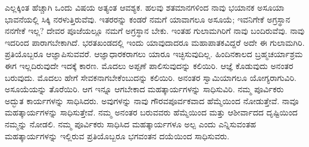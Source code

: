 ಎಲ್ಲಕ್ಕಿಂತ ಹೆಚ್ಚಾಗಿ ಒಂದು ವಿಷಯ ಅತ್ಯಂತ ಆವಶ್ಯಕ. ಹಲವು ಶತಮಾನಗಳಿಂದ ನಾವು ಭಯಾನಕ ಅಸೂಯಾ ಭಾವನೆಯಲ್ಲಿ ಸಿಕ್ಕಿ ನರಳುತ್ತಿರುವೆವು. ಇತರರನ್ನು ಕಂಡರೆ ನಮಗೆ ಯಾವಾಗಲೂ ಅಸೂಯೆ; ಇವನಿಗೇಕೆ ಅಗ್ರಸ್ಥಾನ ನನಗೇಕೆ ಇಲ್ಲ? ದೇವರ ಪೂಜೆಯಲ್ಲೂ ನಮಗೆ ಅಗ್ರಸ್ಥಾನ ಬೇಕು. ಇಂತಹ ಗುಲಾಮಗಿರಿಗೆ ನಾವು ಬಂದಿರುವೆವು. ನಾವು ಇದರಿಂದ ಪಾರಾಗಬೇಕಾಗಿದೆ. ಭರತಖಂಡದಲ್ಲಿ ಇಂದು ಯಾವುದಾದರೂ ಮಹಾಪಾತಕವಿದ್ದರೆ ಅದೇ ಈ ಗುಲಾಮಗಿರಿ. ಪ್ರತಿಯೊಬ್ಬರೂ ಆಜ್ಞಾಪಿಸುವವರೆ. ಆಜ್ಞಾಧಾರಕರಾಗಲು ಯಾರೂ ಇಚ್ಛಿಸುವುದಿಲ್ಲ. ಹಿಂದಿನಕಾಲದ ಬ್ರಹ್ಮಚರ್ಯಾಶ್ರಮ ಈಗ ಇಲ್ಲದಿರುವುದೇ ಇದಕ್ಕೆ ಕಾರಣ. ಮೊದಲು ಅಪ್ಪಣೆ ಪಾಲಿಸುವುದನ್ನು ಕಲಿಯಿರಿ. ಆಜ್ಞೆ ಕೊಡುವುದು ಅನಂತರ ಬರುವುದು. ಮೊದಲು ಹೇಗೆ ಸೇವಕನಾಗಬೇಕೆಂಬುದನ್ನು ಕಲಿಯಿರಿ. ಅನಂತರ ಸ್ವಾಮಿಯಾಗಲೂ ಯೋಗ್ಯರಾಗುವಿರಿ. ಅಸೂಯೆಯನ್ನು ತೊರೆಯಿರಿ. ಆಗ ಇನ್ನೂ ಆಗಬೇಕಾದ ಮಹತ್ಕಾರ್ಯಗಳನ್ನು ಸಾಧಿಸುವಿರಿ. ನಮ್ಮ ಪೂರ್ವಿಕರು ಅದ್ಭುತ ಕಾರ್ಯಗಳನ್ನು ಸಾಧಿಸಿದರು. ಅವುಗಳನ್ನು ನಾವು ಗೌರವಪೂರ್ವಕವಾದ ಹೆಮ್ಮೆಯಿಂದ ನೋಡುತ್ತೇವೆ. ನಾವೂ ಮಹತ್ಕಾರ್ಯಗಳನ್ನು ಸಾಧಿಸುತ್ತೇವೆ. ನಮ್ಮ ಅನಂತರ ಬರುವವರು ಹೆಮ್ಮೆಯಿಂದ ಮತ್ತು ಆಶೀರ್ವಾದದ ದೃಷ್ಟಿಯಿಂದ ನಮ್ಮನ್ನು ನೋಡಲಿ. ನಮ್ಮ ಪೂರ್ವಿಕರು ಸಾಧಿಸಿದ ಮಹತ್ಕಾರ್ಯಗಳೂ ಅಲ್ಪ ಎಂದು ಎನ್ನಿಸುವಂತಹ ಮಹತ್ಕಾರ್ಯಗಳನ್ನು ಇಲ್ಲಿರುವ ಪ್ರತಿಯೊಬ್ಬರೂ ಭಗವಂತನ ದಯೆಯಿಂದ ಸಾಧಿಸುವರು.

